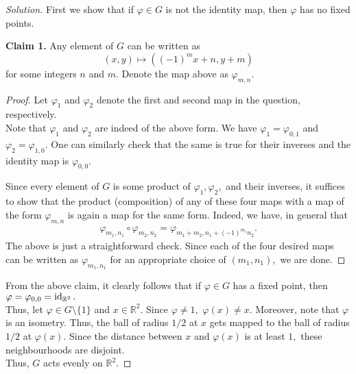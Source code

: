 \documentclass[12pt]{article}
\newenvironment{blockquote}
{\begin{mdframed}[skipabove=0pt, skipbelow=0pt, innertopmargin=4pt, innerbottommargin=4pt, bottomline=false,topline=false,rightline=false, linewidth=2pt]}
{\end{mdframed}}
\newenvironment{soln}{\begin{proof}[Solution]}{\end{proof}}
\begin{document}
\begin{soln}
	First we show that if $\varphi \in G$ is not the identity map, then $\varphi$ has no fixed points.\\
	\begin{blockquote}
		\textbf{Claim 1.} Any element of $G$ can be written as
		\begin{equation*} 
			(x, y) \mapsto ((-1)^mx + n, y + m)
		\end{equation*}
		for some integers $n$ and $m.$ Denote the map above as $\varphi_{m, n}.$
		\begin{proof} 
			Let $\varphi_1$ and $\varphi_2$ denote the first and second map in the question, respectively.\\
			Note that $\varphi_1$ and $\varphi_2$ are indeed of the above form. We have $\varphi_1 = \varphi_{0, 1}$ and $\varphi_2 = \varphi_{1, 0}.$ One can similarly check that the same is true for their inverses and the identity map is $\varphi_{0, 0}.$ 

			Since every element of $G$ is some product of $\varphi_1, \varphi_2,$ and their inverses, it suffices to show that the product (composition) of any of these four maps with a map of the form $\varphi_{m, n}$ is again a map for the same form. Indeed, we have, in general that
			\begin{align*} 
				\varphi_{m_1, n_1}\circ\varphi_{m_2, n_2} = \varphi_{m_1 + m_2, n_1 + (-1)^{m_1}n_2}.
			\end{align*}
			The above is just a straightforward check. Since each of the four desired maps can be written as $\varphi_{m_1, n_1}$ for an appropriate choice of $(m_1, n_1),$ we are done.
		\end{proof}
	\end{blockquote}
		From the above claim, it clearly follows that if $\varphi \in G$ has a fixed point, then $\varphi = \varphi_{0, 0} = \operatorname{id}_{\mathbb{R}^2}.$ \\
		Thus, let $\varphi \in G\setminus\{1\}$ and $x \in \mathbb{R}^2.$ Since $\varphi \neq 1,$ $\varphi(x) \neq x.$ Moreover, note that $\varphi$ is an isometry. Thus, the ball of radius $1/2$ at $x$ gets mapped to the ball of radius $1/2$ at $\varphi(x).$ Since the distance between $x$ and $\varphi(x)$ is at least $1,$ these neighbourhoods are disjoint.\\
		Thus, $G$ acts evenly on $\mathbb{R}^2.$


\end{soln}
\end{document}
